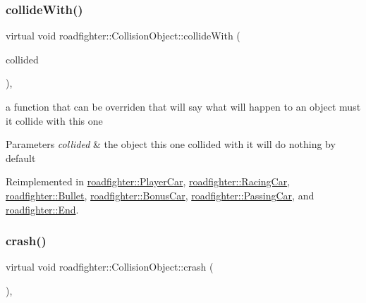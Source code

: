 \subsubsection{\texorpdfstring{collide\+With()}{collideWith()}}
{\footnotesize\ttfamily virtual void roadfighter\+::\+Collision\+Object\+::collide\+With (\begin{DoxyParamCaption}\item[{std\+::shared\+\_\+ptr$<$ \hyperlink{classroadfighter_1_1CollisionObject}{Collision\+Object} $>$ \&}]{collided }\end{DoxyParamCaption})\hspace{0.3cm}{\ttfamily [inline]}, {\ttfamily [virtual]}}

a function that can be overriden that will say what will happen to an object must it collide with this one 
\begin{DoxyParams}{Parameters}
{\em collided} & the object this one collided with it will do nothing by default \\
\hline
\end{DoxyParams}


Reimplemented in \hyperlink{classroadfighter_1_1PlayerCar_ab62e40d949ac12f402fdaaab15c69b81}{roadfighter\+::\+Player\+Car}, \hyperlink{classroadfighter_1_1RacingCar_a1de00cf7c8df548e8ab57a27cefb7345}{roadfighter\+::\+Racing\+Car}, \hyperlink{classroadfighter_1_1Bullet_a36156632331e59c11abf5ae76024bc1f}{roadfighter\+::\+Bullet}, \hyperlink{classroadfighter_1_1BonusCar_ad1ce65b53e5652eac482a7b00c9a1d51}{roadfighter\+::\+Bonus\+Car}, \hyperlink{classroadfighter_1_1PassingCar_a04ee71b75c90f21efef591756855bf37}{roadfighter\+::\+Passing\+Car}, and \hyperlink{classroadfighter_1_1End_a56dfbe6f0c760a5728b58fc9d9f40486}{roadfighter\+::\+End}.

\mbox{\label{classroadfighter_1_1CollisionObject_a9a5265d810f0ed7583b60046ab3fa88c}} 
\subsubsection{\texorpdfstring{crash()}{crash()}}
{\footnotesize\ttfamily virtual void roadfighter\+::\+Collision\+Object\+::crash (\begin{DoxyParamCaption}{ }\end{DoxyParamCaption})\hspace{0.3cm}{\ttfamily [inline]}, {\ttfamily [virtual]}}

